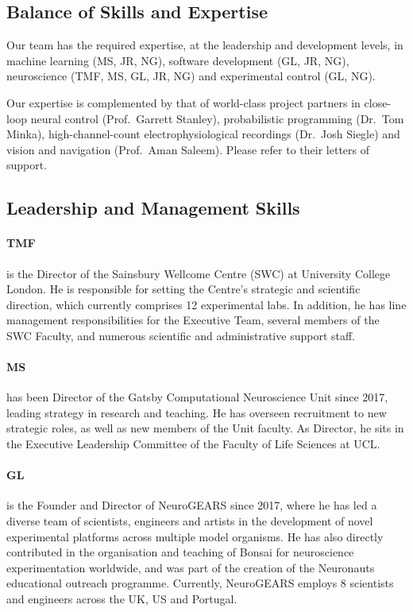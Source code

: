 \subsection{Balance of Skills and Expertise}

Our team has the required expertise, at the leadership and development levels,
in machine learning (MS, JR, NG), software development (GL, JR, NG), neuroscience
(TMF, MS, GL, JR, NG) and experimental control (GL, NG).

Our expertise is complemented by that of world-class project partners in
close-loop neural control (Prof.~Garrett Stanley), probabilistic programming
(Dr.~Tom Minka), high-channel-count electrophysiological recordings (Dr.~Josh
Siegle) and vision and navigation (Prof.~Aman Saleem).  Please refer to their
letters of support.

\subsection{Leadership and Management Skills}

\paragraph{TMF} is the Director of the Sainsbury Wellcome Centre (SWC) at
University College London. He is responsible for setting the Centre’s strategic
and scientific direction, which currently comprises 12 experimental labs. In
addition, he has line management responsibilities for the Executive Team,
several members of the SWC Faculty, and numerous scientific and administrative
support staff.

\paragraph{MS} has been Director of the Gatsby Computational
Neuroscience Unit since 2017, leading strategy in research and teaching. He has overseen
recruitment to new strategic roles, as well as new members of the Unit faculty.
As Director, he sits in the Executive
Leadership Committee of the Faculty of Life Sciences at UCL.

\paragraph{GL} is the Founder and Director of NeuroGEARS since 2017, where he
has led a diverse team of scientists, engineers and artists in the development
of novel experimental platforms across multiple model organisms. He has also
directly contributed in the organisation and teaching of Bonsai for
neuroscience experimentation worldwide, and was part of the creation of the
Neuronauts educational outreach programme. Currently, NeuroGEARS employs 8
scientists and engineers across the UK, US and Portugal.

